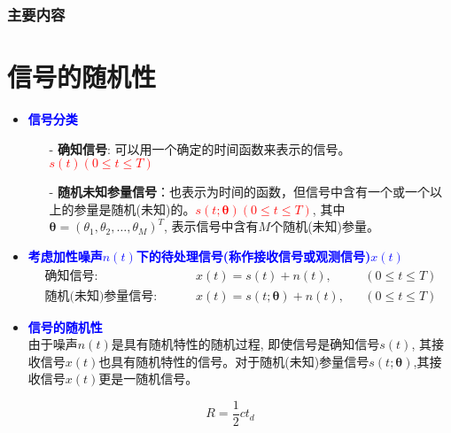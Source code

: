 \begin{frame}
  \frametitle{主要内容}
  \tableofcontents[hideallsubsections]
\end{frame}

\section{信号的随机性}
\begin{frame}
\begin{itemize}
	\item \textcolor{blue}{\textbf{信号分类}}
	\begin{itemize}
		\item[-] \textbf{确知信号}: 可以用一个确定的时间函数来表示的信号。\textcolor{red}{$s(t)(0\le t\le T)$}
		\item[-] \textbf{随机未知参量信号}：也表示为时间的函数，但信号中含有一个或一个以上的参量是随机(未知)的。\textcolor{red}{$s(t;\bm{\theta})(0\le t\le T)$}, 其中$\bm{\theta}=(\theta_1,\theta_2,\dots,\theta_M)^T$, 表示信号中含有$M$个随机(未知)参量。
	\end{itemize}
    \item \textcolor{blue}{\textbf{考虑加性噪声$n(t)$下的待处理信号(称作接收信号或观测信号)$x(t)$}}
    \begin{align*}
    \textbf{确知信号: }\qquad &x(t)=s(t)+n(t), &&(0\le t\le T)\\
    \textbf{随机(未知)参量信号: }\qquad &x(t)=s(t;\bm{\theta})+n(t), &&(0\le t\le T)
    \end{align*}
    \item \textcolor{blue}{\textbf{信号的随机性}}\\
    由于噪声$n(t)$是具有随机特性的随机过程, 即使信号是确知信号$s(t)$, 其接收信号$x(t)$也具有随机特性的信号。对于随机(未知)参量信号$s(t;\bm{\theta})$,其接收信号$x(t)$更是一随机信号。
\end{itemize}
\end{frame}

\begin{frame}
\[R=\frac{1}{2}ct_d \]
\end{frame}


